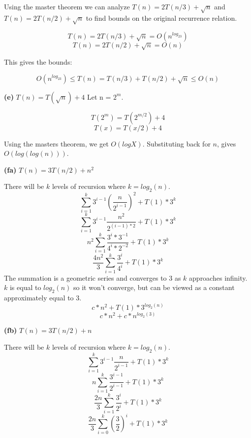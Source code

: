 \documentclass[11pt]{article}
\renewcommand\part[1]{\vspace{.10in}\textbf{(#1)}}
\begin{document}
Using the master theorem we can analyze $T(n) = 2T(n/3) + \sqrt{n}$ and $T(n) = 2T(n/2) + \sqrt{n}$ to find bounds on the original recurrence relation.

$$T(n) = 2T(n/3) + \sqrt{n} = O(n^{log_23})$$
$$T(n) = 2T(n/2) + \sqrt{n} = O(n)$$

This gives the bounds:

$$O(n^{log_23}) \leq T(n) = T(n/3) + T(n/2) + \sqrt{n} \leq O(n)$$


\part{e} $T(n) = T(\sqrt{n}) + 4$
Let n = $2^m$.

$$T(2^m) = T(2^{m/2}) + 4$$
$$T(x) = T(x/2) + 4$$

Using the masters theorem, we get $O(logX)$. Substituting back for $n$, gives $O(log(log(n)))$.


\part{fa} $T(n) = 3T(n/2) + n^2$

There will be $k$ levels of recursion where $ k = log_2(n)$.
$$\sum\limits_{i=1}^k 3^{i-1} (\frac{n}{2^{i-1}})^2 + T(1) * 3^k$$
$$\sum\limits_{i=1}^k 3^{i-1} \frac{n^2}{2^{(i-1)*2}} + T(1) * 3^k$$
$$n^2\sum\limits_{i=1}^k \frac{3^{i}*3^{-1}}{4^{i}*2^{-2}} + T(1) * 3^k$$
$$\frac{4n^2}{3}\sum\limits_{i=1}^k \frac{3^{i}}{4^{i}} + T(1) * 3^k$$
The summation is a geometric series and converges to 3 as $k$ approaches infinity. $k$ is equal to $log_2(n)$ so it won't converge, but can be viewed as a constant approximately equal to 3.
$$c * n^2 + T(1) * 3^{log_2(n)}$$
$$ c * n^2 + c * n^{log_2(3)}$$


\part{fb} $T(n) = 3T(n/2) + n$

There will be $k$ levels of recursion where $ k = log_2(n)$.
$$\sum\limits_{i=1}^k 3^{i-1} \frac{n}{2^{i-1}} + T(1) * 3^k$$
$$n\sum\limits_{i=1}^k \frac{3^{i-1}}{2^{i-1}} + T(1) * 3^k$$
$$\frac{2n}{3}\sum\limits_{i=1}^k \frac{3^{i}}{2^{i}} + T(1) * 3^k$$
$$\frac{2n}{3}\sum\limits_{i=0}^k (\frac{3}{2})^i + T(1) * 3^k$$
\end{document}

